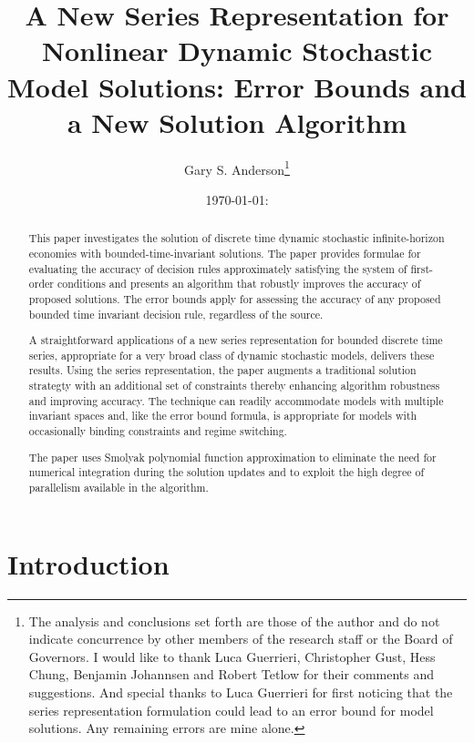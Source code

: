 \documentclass[12pt]{article}
\author{Gary S. Anderson\thanks{The analysis and conclusions set forth are those of the author and do not indicate concurrence by other members of the research staff or the Board of Governors. I would like to thank Luca Guerrieri, Christopher Gust, Hess Chung, Benjamin Johannsen  and Robert Tetlow for their comments and suggestions.  And special thanks to Luca Guerrieri for first noticing that the series representation formulation could lead to an error bound for model solutions. Any remaining errors are mine alone.}}
\title{A New Series Representation for 
  Nonlinear Dynamic Stochastic Model Solutions: 
  Error Bounds and a New Solution Algorithm} %
\date{\today: \currenttime}
\begin{document}



\maketitle

\begin{abstract}
This paper investigates the solution of discrete time  dynamic stochastic
infinite-horizon economies with bounded-time-invariant solutions.
The paper provides formulae for evaluating the accuracy of decision rules
approximately satisfying the system of first-order conditions and presents
an algorithm that robustly improves the accuracy of proposed solutions.
The error bounds apply for assessing the accuracy of any proposed bounded time invariant decision rule, regardless of the source.

A straightforward applications of a  new series representation
for bounded discrete time series, appropriate for
a very broad class of dynamic stochastic models, delivers these results.
Using the series representation, the paper 
augments a traditional solution strategty with an additional set of
constraints thereby
enhancing algorithm robustness and improving accuracy.
The technique can readily accommodate models with multiple invariant spaces
and, like the error bound formula,  is appropriate
for models with occasionally binding constraints and regime switching. 





The  paper uses 
Smolyak polynomial function approximation  
to eliminate the need for numerical integration during the solution updates 
and to exploit the high degree of parallelism available in the algorithm.








\end{abstract}

\newpage
\tableofcontents
\newpage

\section{Introduction}
\end{document}
